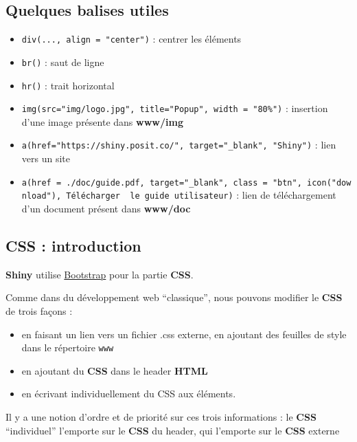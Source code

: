 \documentclass[
]{article}
\providecommand{\tightlist}{%
  \setlength{\itemsep}{0pt}\setlength{\parskip}{0pt}}
\begin{document}
\hypertarget{quelques-balises-utiles}{%
\subsection{Quelques balises utiles}\label{quelques-balises-utiles}}

\begin{itemize}
\tightlist
\item
  \texttt{div(...,\ align\ =\ "center")} : centrer les éléments
\item
  \texttt{br()} : saut de ligne
\item
  \texttt{hr()} : trait horizontal
\item
  \texttt{img(src="img/logo.jpg",\ title="Popup",\ width\ =\ "80\%")} :
  insertion d'une image présente dans \textbf{www/img}
\item
  \texttt{a(href="https://shiny.posit.co/",\ target="\_blank",\ "Shiny")}
  : lien vers un site
\item
  \texttt{a(href\ =\ \textquotesingle{}./doc/guide.pdf\textquotesingle{},\ target="\_blank",\ class\ =\ "btn",\ icon("download"),\ \textquotesingle{}Télécharger\ \ le\ guide\ utilisateur\textquotesingle{})}
  : lien de téléchargement d'un document présent dans \textbf{www/doc}
\end{itemize}

\hypertarget{css-introduction}{%
\subsection{CSS : introduction}\label{css-introduction}}

\textbf{Shiny} utilise \href{http://getbootstrap.com/}{Bootstrap} pour
la partie \textbf{CSS}.

Comme dans du développement web ``classique'', nous pouvons modifier le
\textbf{CSS} de trois façons :

\begin{itemize}
\tightlist
\item
  en faisant un lien vers un fichier .css externe, en ajoutant des
  feuilles de style dans le répertoire \texttt{www}
\item
  en ajoutant du \textbf{CSS} dans le header \textbf{HTML}
\item
  en écrivant individuellement du CSS aux éléments.
\end{itemize}

Il y a une notion d'ordre et de priorité sur ces trois informations : le
\textbf{CSS} ``individuel'' l'emporte sur le \textbf{CSS} du header, qui
l'emporte sur le \textbf{CSS} externe
\end{document}
